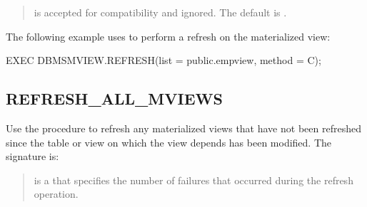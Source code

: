 \documentclass[letterpaper,10pt,english,openany,oneside]{sphinxmanual}
\begin{document}
\begin{quote}

 is accepted for compatibility and ignored. The default is
.
\end{quote}


The following example uses  to perform a 
refresh on the  materialized view:

%
\begin{sphinxVerbatim}[commandchars=\\\{\}]
EXEC DBMS\PYGZus{}MVIEW.REFRESH(list =\PYGZgt{} \PYGZsq{}public.emp\PYGZus{}view\PYGZsq{}, method =\PYGZgt{} \PYGZsq{}C\PYGZsq{});
\end{sphinxVerbatim}

\newpage


\subsection{REFRESH\_ALL\_MVIEWS}
\label{\detokenize{refresh_all_mviews::doc}}\label{\detokenize{refresh_all_mviews:refresh-all-mviews}}
Use the  procedure to refresh any materialized views
that have not been refreshed since the table or view on which the view
depends has been modified. The signature is:
\begin{quote}

\begin{quote}





\end{quote}
\end{quote}


\begin{quote}

 is a  that specifies the
number of failures that occurred during the refresh operation.
\end{quote}
\end{document}
